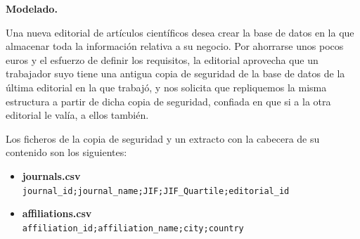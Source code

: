 \documentclass[12pt,a4paper,addpoints,answers]{exam}
\begin{document}
\begin{questions}

\question[3] \textbf{Modelado.}

Una nueva editorial de artículos científicos desea crear la base de datos en la que almacenar toda la información relativa a su negocio. Por ahorrarse unos pocos euros y el esfuerzo de definir los requisitos, la editorial aprovecha que un trabajador suyo tiene una antigua copia de seguridad de la base de datos de la última editorial en la que trabajó, y nos solicita que repliquemos la misma estructura a partir de dicha copia de seguridad, confiada en que si a la otra editorial le valía, a ellos también.

Los ficheros de la copia de seguridad y un extracto con la cabecera de su contenido son los siguientes:


\begin{itemize}
    
    \item \textbf{journals.csv} \vspace{0.5em} \\  
    \texttt{journal\_id;journal\_name;JIF;JIF\_Quartile;editorial\_id\\
    }
    
    \item \textbf{affiliations.csv} \vspace{0.5em} \\
    \texttt{affiliation\_id;affiliation\_name;city;country\\
    }
    

\end{itemize}
\end{questions}
\end{document}
